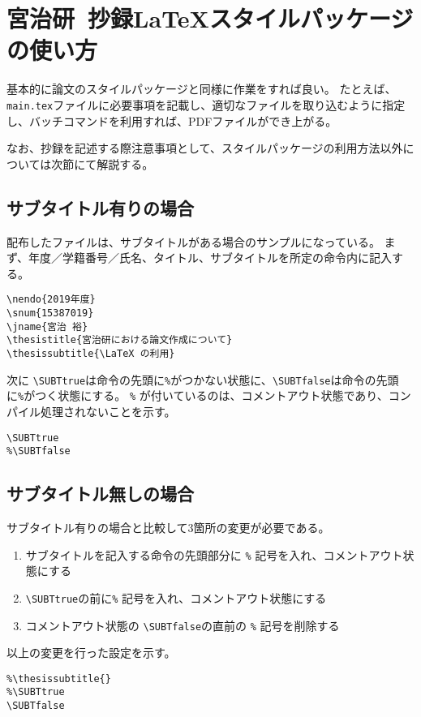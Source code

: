 \documentclass[a4paper,10pt,twocolumn]{jsarticle}
\begin{document}
\section{宮治研~抄録\LaTeX スタイルパッケージの使い方}
基本的に論文のスタイルパッケージと同様に作業をすれば良い。
たとえば、\verb+main.tex+ファイルに必要事項を記載し、適切なファイルを取り込むように指定し、バッチコマンドを利用すれば、PDFファイルができ上がる。

なお、抄録を記述する際注意事項として、スタイルパッケージの利用方法以外については次節にて解説する。

\subsection{サブタイトル有りの場合}
配布したファイルは、サブタイトルがある場合のサンプルになっている。
まず、年度／学籍番号／氏名、タイトル、サブタイトルを所定の命令内に記入する。
\begin{screen}
{\small
\begin{verbatim}
\nendo{2019年度}
\snum{15387019}
\jname{宮治 裕}
\thesistitle{宮治研における論文作成について}
\thesissubtitle{\LaTeX の利用}
\end{verbatim}
}
\end{screen}
次に \verb+\SUBTtrue+は命令の先頭に\verb+%+がつかない状態に、\verb+\SUBTfalse+は命令の先頭に\verb+%+がつく状態にする。
\verb+%+ が付いているのは、コメントアウト状態であり、コンパイル処理されないことを示す。
\begin{screen}
{\small
\begin{verbatim}
\SUBTtrue
%\SUBTfalse
\end{verbatim}
}
\end{screen}

\subsection{サブタイトル無しの場合}
サブタイトル有りの場合と比較して3箇所の変更が必要である。
\begin{enumerate}
\item サブタイトルを記入する命令の先頭部分に \verb+%+ 記号を入れ、コメントアウト状態にする
\item \verb+\SUBTtrue+の前に\verb+%+ 記号を入れ、コメントアウト状態にする
\item コメントアウト状態の \verb+\SUBTfalse+の直前の \verb+%+ 記号を削除する
\end{enumerate}
以上の変更を行った設定を示す。
\begin{screen}
{\small
\begin{verbatim}
%\thesissubtitle{}
%\SUBTtrue
\SUBTfalse
\end{verbatim}
}
\end{screen}

%
\end{document}
